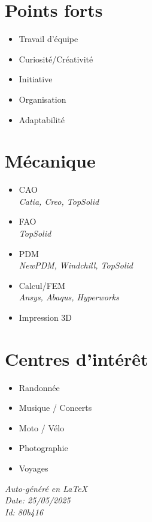 \documentclass[]{friggeri-cv}
\begin{document}
\begin{aside}
\section{Points forts}
\begin{itemize}
\item Travail d'équipe
\item Curiosité/Créativité
\item Initiative
\item Organisation
\item Adaptabilité
\end{itemize}
\section{Mécanique}
\begin{itemize}
\item CAO
 \\ \hspace*{0.2em}\small\textit{Catia, Creo, TopSolid}
\item FAO
 \\ \hspace*{0.2em}\small\textit{TopSolid}
\item PDM
 \\ \hspace*{0.2em}\small\textit{NewPDM, Windchill, TopSolid}
\item Calcul/FEM
 \\ \hspace*{0.2em}\small\textit{Ansys, Abaqus, Hyperworks}
\item Impression 3D
\end{itemize}
\section{Centres d'intérêt}
\begin{itemize}
\item Randonnée
\item Musique / Concerts
\item Moto / Vélo
\item Photographie
\item Voyages
\end{itemize}
\vspace{2.5mm}%
\small \emph{Auto-généré en \LaTeX}\\
\small \emph{Date: 25/05/2025} \hspace*{8mm}\\
\small \emph{Id: 80b416} %

\end{aside}
\end{document}
